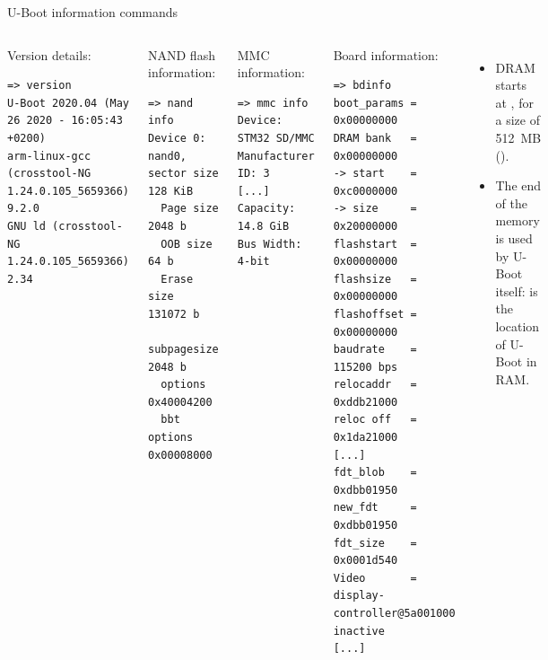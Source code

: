 \begin{frame}[fragile]{U-Boot information commands}

  \begin{columns}
    \begin{block}{Version details: }
      {\tiny
\begin{verbatim}
=> version
U-Boot 2020.04 (May 26 2020 - 16:05:43 +0200)
arm-linux-gcc (crosstool-NG 1.24.0.105_5659366) 9.2.0
GNU ld (crosstool-NG 1.24.0.105_5659366) 2.34
\end{verbatim}
      }
    \end{block}

    \begin{block}{NAND flash information: }
      {\tiny
\begin{verbatim}
=> nand info
Device 0: nand0, sector size 128 KiB
  Page size       2048 b
  OOB size          64 b
  Erase size    131072 b
  subpagesize     2048 b
  options     0x40004200
  bbt options 0x00008000
\end{verbatim}
      }
    \end{block}

    \begin{block}{MMC information: }
      {\tiny
\begin{verbatim}
=> mmc info
Device: STM32 SD/MMC
Manufacturer ID: 3
[...]
Capacity: 14.8 GiB
Bus Width: 4-bit
\end{verbatim}
      }
    \end{block}


    \begin{block}{Board information: }
      {\tiny
\begin{verbatim}
=> bdinfo
boot_params = 0x00000000
DRAM bank   = 0x00000000
-> start    = 0xc0000000
-> size     = 0x20000000
flashstart  = 0x00000000
flashsize   = 0x00000000
flashoffset = 0x00000000
baudrate    = 115200 bps
relocaddr   = 0xddb21000
reloc off   = 0x1da21000
[...]
fdt_blob    = 0xdbb01950
new_fdt     = 0xdbb01950
fdt_size    = 0x0001d540
Video       = display-controller@5a001000 inactive
[...]
\end{verbatim}
      }
    \end{block}

    {\scriptsize
      \begin{itemize}
      \item DRAM starts at , for a size of 512~MB
        ().
      \item The end of the memory is used by U-Boot itself:
         is the location of U-Boot in RAM.
      \end{itemize}
    }
  \end{columns}
\end{frame}

